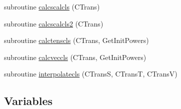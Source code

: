 \begin{DoxyCompactItemize}
subroutine \mbox{\hyperlink{namespacecambmain_a8b2cc98e7553a77d720caca21f5ae8e5}{calcscalcls}} (C\+Trans)
\item 
subroutine \mbox{\hyperlink{namespacecambmain_a89e57ae788ae9b3065000febda0566a5}{calcscalcls2}} (C\+Trans)
\item 
subroutine \mbox{\hyperlink{namespacecambmain_a412610e13dd6e264ce9d9ac33e0fbc1f}{calctenscls}} (C\+Trans, Get\+Init\+Powers)
\item 
subroutine \mbox{\hyperlink{namespacecambmain_a709092859c794b6298b580be81ff9a90}{calcveccls}} (C\+Trans, Get\+Init\+Powers)
\item 
subroutine \mbox{\hyperlink{namespacecambmain_a411e6e866cbb05f2ba3f7164f8e04a67}{interpolatecls}} (C\+TransS, C\+TransT, C\+TransV)
\end{DoxyCompactItemize}
\subsection*{Variables}
